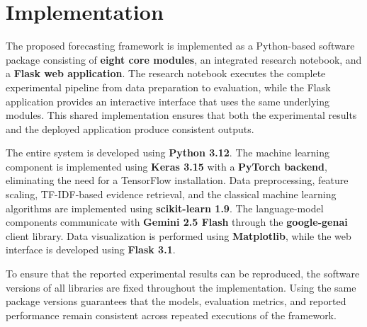 \section{Implementation}\label{sec:implementation}

The proposed forecasting framework is implemented as a Python-based
software package consisting of \textbf{eight core modules}, an
integrated research notebook, and a \textbf{Flask web application}. The
research notebook executes the complete experimental pipeline from data
preparation to evaluation, while the Flask application provides an
interactive interface that uses the same underlying modules. This shared
implementation ensures that both the experimental results and the
deployed application produce consistent outputs.

The entire system is developed using \textbf{Python 3.12}. The machine
learning component is implemented using \textbf{Keras 3.15} with a
\textbf{PyTorch backend}, eliminating the need for a TensorFlow
installation. Data preprocessing, feature scaling, TF-IDF-based evidence
retrieval, and the classical machine learning algorithms are implemented
using \textbf{scikit-learn 1.9}. The language-model components
communicate with \textbf{Gemini 2.5 Flash} through the
\textbf{google-genai} client library. Data visualization is performed
using \textbf{Matplotlib}, while the web interface is developed using
\textbf{Flask 3.1}.

To ensure that the reported experimental results can be reproduced, the
software versions of all libraries are fixed throughout the
implementation. Using the same package versions guarantees that the
models, evaluation metrics, and reported performance remain consistent
across repeated executions of the framework.

